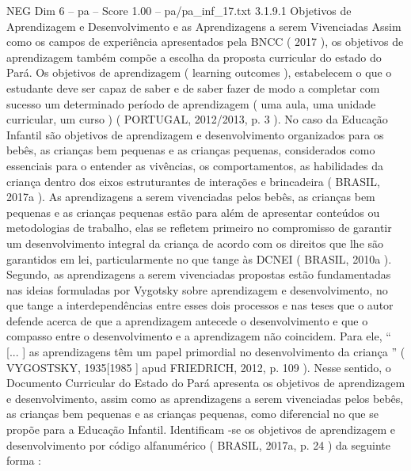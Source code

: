 \begin{textsample}{NEG Dim 6 – pa – Score 1.00 – pa/pa\_inf\_17.txt}  \label{ex:f6_neg_227}
3.1.9.1 Objetivos de Aprendizagem e Desenvolvimento e as Aprendizagens a serem Vivenciadas Assim como os campos de experiência apresentados pela BNCC ( 2017 ), os objetivos de aprendizagem também compõe a escolha da proposta curricular do estado do Pará.
Os objetivos de aprendizagem ( learning outcomes ), estabelecem o que o estudante deve ser capaz de saber e de saber fazer de modo a completar com sucesso um determinado período de aprendizagem ( uma aula, uma unidade curricular, um curso ) ( PORTUGAL, 2012/2013, p. 3 ).
No caso da Educação Infantil são objetivos de aprendizagem e desenvolvimento organizados para os bebês, as crianças bem pequenas e as crianças pequenas, considerados como essenciais para o entender as vivências, os comportamentos, as habilidades da criança dentro dos eixos estruturantes de interações e brincadeira ( BRASIL, 2017a ).
As aprendizagens a serem vivenciadas pelos bebês, as crianças bem pequenas e as crianças pequenas estão para além de apresentar conteúdos ou metodologias de trabalho, elas se refletem primeiro no compromisso de garantir um desenvolvimento integral da criança de acordo com os direitos que lhe são garantidos em lei, particularmente no que tange às DCNEI ( BRASIL, 2010a ).
Segundo, as aprendizagens a serem vivenciadas propostas estão fundamentadas nas ideias formuladas por Vygotsky sobre aprendizagem e desenvolvimento, no que tange a interdependências entre esses dois processos e nas teses que o autor defende acerca de que a aprendizagem antecede o desenvolvimento e que o compasso entre o desenvolvimento e a aprendizagem não coincidem.
Para ele, “ [... ] as aprendizagens têm um papel primordial no desenvolvimento da criança ” ( VYGOSTSKY, 1935[1985 ] apud FRIEDRICH, 2012, p. 109 ).
Nesse sentido, o Documento Curricular do Estado do Pará apresenta os objetivos de aprendizagem e desenvolvimento, assim como as aprendizagens a serem vivenciadas pelos bebês, as crianças bem pequenas e as crianças pequenas, como diferencial no que se propõe para a Educação Infantil.
Identificam -se os objetivos de aprendizagem e desenvolvimento por código alfanumérico ( BRASIL, 2017a, p. 24 ) da seguinte forma :

\end{textsample}
